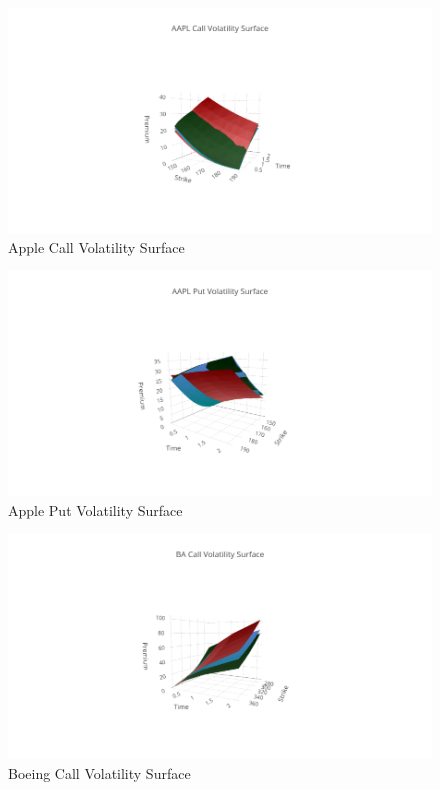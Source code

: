 \documentclass{article}
\begin{document}
\begin{figure}[h!]
\includegraphics[width =\textwidth]{images/VolSurface/AAPLCall.png}
\caption{Apple Call Volatility Surface}
\centering
\end{figure}
\begin{figure}[h!]
\includegraphics[width =\textwidth]{images/VolSurface/APPLPut.png}
\caption{Apple Put Volatility Surface}
\centering
\end{figure}
\begin{figure}[h!]
\includegraphics[width =\textwidth]{images/VolSurface/BACall.png}
\caption{Boeing Call Volatility Surface}
\centering
\end{figure}
\end{document}
